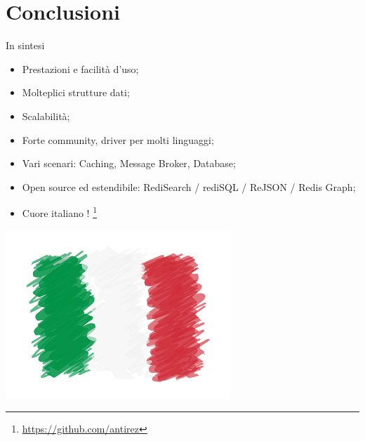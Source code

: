 \documentclass[xcolor=dvipsnames]{beamer}
\begin{document}
      \section{Conclusioni}
        \begin{frame}
          \begin{block}{\centering \huge \insertsectionhead}
          \end{block}
        \end{frame}
        \begin{frame}{In sintesi}
          \begin{itemize}
            \item Prestazioni e facilità d'uso;
            \item Molteplici strutture dati;
            \item Scalabilità;
            \item Forte community, driver per molti linguaggi;
            \item Vari scenari: Caching, Message Broker, Database;
            \item Open source ed estendibile: RediSearch / rediSQL / ReJSON / Redis Graph;
            \item Cuore italiano ! \footnote{\url{https://github.com/antirez}}
          \end{itemize}
          \begin{center}
          \includegraphics[height=2.cm]{res/italy.jpg}
          \end{center}
        \end{frame}



\end{document}
